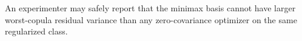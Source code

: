 An experimenter may safely report that the minimax basis cannot have larger worst-copula residual variance than any zero-covariance optimizer on the same regularized class.